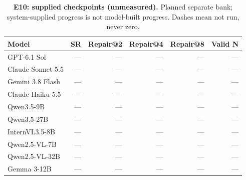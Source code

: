 \begin{table}[!ht]
\centering\small
\caption{\textbf{E10: supplied checkpoints (unmeasured).} Planned separate bank; system-supplied progress is not model-built progress. Dashes mean not run, never zero.}
\begin{tabularx}{\textwidth}{@{}Xrrrrr@{}}\toprule
Model & SR & Repair@2 & Repair@4 & Repair@8 & Valid N\\\midrule
GPT-6.1 Sol & --- & --- & --- & --- & ---\\
Claude Sonnet 5.5 & --- & --- & --- & --- & ---\\
Gemini 3.8 Flash & --- & --- & --- & --- & ---\\
Claude Haiku 5.5 & --- & --- & --- & --- & ---\\
Qwen3.5-9B & --- & --- & --- & --- & ---\\
Qwen3.5-27B & --- & --- & --- & --- & ---\\
InternVL3.5-8B & --- & --- & --- & --- & ---\\
Qwen2.5-VL-7B & --- & --- & --- & --- & ---\\
Qwen2.5-VL-32B & --- & --- & --- & --- & ---\\
Gemma 3-12B & --- & --- & --- & --- & ---\\
\bottomrule
\end{tabularx}
\end{table}
